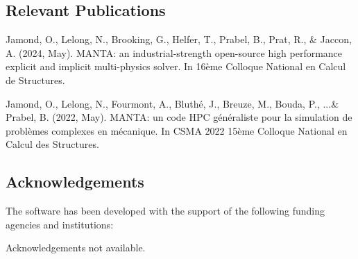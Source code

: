 \subsection{Relevant Publications}
\label{sec:MANTA:publications}
Jamond, O., Lelong, N., Brooking, G., Helfer, T., Prabel, B., Prat, R., \& Jaccon, A. (2024, May). MANTA: an industrial-strength open-source high performance explicit and implicit multi-physics solver. In 16ème Colloque National en Calcul de Structures.

Jamond, O., Lelong, N., Fourmont, A., Bluthé, J., Breuze, M., Bouda, P., ...\& Prabel, B. (2022, May). MANTA: un code HPC généraliste pour la simulation de problèmes complexes en mécanique. In CSMA 2022 15ème Colloque National en Calcul des Structures. 


\subsection{Acknowledgements}
\label{sec::MANTA:acknowledgements}

The software has been developed with the support of the following funding agencies and institutions: 




Acknowledgements not available.



